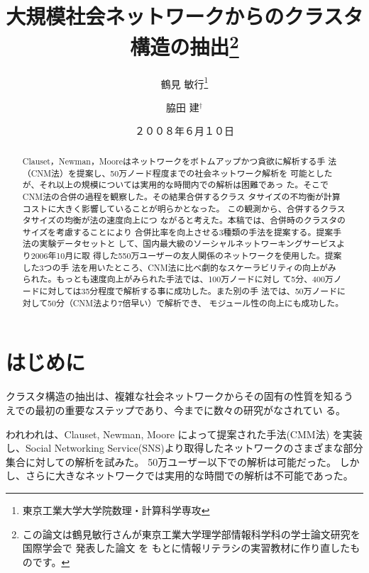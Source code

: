 \documentclass [a4j,11pt] {jsarticle}
\title  {大規模社会ネットワークからのクラスタ構造の抽出\thanks {
  この論文は鶴見敏行さんが東京工業大学理学部情報科学科の学士論文研究を国際学会で
  発表した論文 \protect\cite {wakita-2007-finding-community-structure-in-mega-scale-social}を
  もとに情報リテラシの実習教材に作り直したものです。}}
\author {鶴見 敏行\thanks {東京工業大学大学院数理・計算科学専攻} \and 脇田 建{$^\dagger$}}
\date {２００８年６月１０日}
\begin{document}
\maketitle


\begin {abstract}
Clauset，Newman，Mooreはネットワークをボトムアップかつ貪欲に解析する手
法（CNM法）を提案し、50万ノード程度までの社会ネットワーク解析を
可能としたが、それ以上の規模については実用的な時間内での解析は困難であっ
た。そこでCNM法の合併の過程を観察した。その結果合併するクラス
タサイズの不均衡が計算コストに大きく影響していることが明らかとなった。
この観測から、合併するクラスタサイズの均衡が法の速度向上につ
ながると考えた。本稿では、合併時のクラスタのサイズを考慮することにより
合併比率を向上させる3種類の手法を提案する。提案手法の実験データセットと
して、国内最大級のソーシャルネットワーキングサービスより2006年10月に取
得した550万ユーザーの友人関係のネットワークを使用した。提案した3つの手
法を用いたところ、CNM法に比べ劇的なスケーラビリティの向上がみ
られた。もっとも速度向上がみられた手法では、100万ノードに対し
て5分、400万ノードに対しては35分程度で解析する事に成功した。また別の手
法では、50万ノードに対して50分（CNM法より7倍早い）で解析でき、
モジュール性の向上にも成功した。
\end {abstract}

\section {はじめに}
\label {sect: はじめに}

クラスタ構造の抽出は、複雑な社会ネットワークからその固有の性質を知るう
えでの最初の重要なステップであり、今までに数々の研究がなされてい
る。
\cite{kleinberg-1999-authoritative-sources-in-a-hyperlinked-environment,
  page-1999-the-pagerank-citation-ranking:-bringing-order,
  dean-1999-finding-related-pages-in-the-world-wide,
  kumar-1999-trawling-the-web-for-emerging-cyber-communities,
  miller-2001-modifications-of-kleinbergs-hits-algorithm-using,
  toyoda-2001-creating-a-web-community-chart-for-navigating-related,
  wu-2004-finding-communities-in-linear-time:-a-physics,
  cai-2004-block-level-link-analysis,
  clauset-2004-finding-community-structure-in-very-large,
  onsjo-2006-a-simple-message-passing-algorithm-for-graph}


われわれは、Clauset, Newman, Moore によって提案された手法(CMM法)
\cite{clauset-2004-finding-community-structure-in-very-large}
を実装し、Social Networking Service(SNS)より取得したネットワークのさまざまな部分集合に対しての解析を試みた。
50万ユーザー以下での解析は可能だった。
しかし、さらに大きなネットワークでは実用的な時間での解析は不可能であった。
\end{document}
